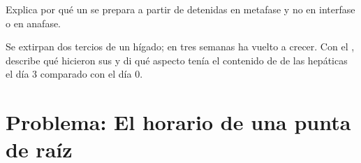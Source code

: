 \begin{exercise}[$\star\star\star$]\label{exo:g11:cell-cycle-mitosis:14}
Explica por qué un  se prepara a partir de  detenidas
en metafase y no en interfase o en anafase.
\end{exercise}

\begin{exercise}[$\star\star\star$]\label{exo:g11:cell-cycle-mitosis:15}
Se extirpan dos tercios de un hígado; en tres semanas ha vuelto a
crecer. Con el , describe qué hicieron sus  y di
qué aspecto tenía el contenido de  de las  hepáticas el día 3
comparado con el día 0.
\end{exercise}

\section{Problema: El horario de una punta de raíz}

